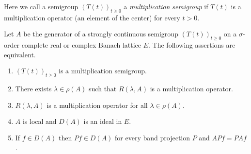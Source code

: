 Here we call a semigroup $(T(t))_{t \geq 0}$ a \emph{multiplication semigroup} if\/ $T(t)$ is a multiplication operator (\ie an element of the center) for every $t > 0$.
\begin{theorem}\label{thm:c2-5.13}
%
Let $A$ be the generator of a strongly continuous semigroup $(T(t))_{t \geq 0}$ on a $\sigma$-order complete real or complex Banach lattice $E$.
The following assertions are equivalent.
\begin{enumerate}[\upshape (a)]
\item \label{thm:c2-5.13-1}
$(T(t))_{t \geq 0}$ is a multiplication semigroup.
\item \label{thm:c2-5.13-2}
There exists $\lambda \in \rho(A)$ such that $R(\lambda,A)$ is a multiplication operator.
\item \label{thm:c2-5.13-3}
$R(\lambda,A)$ is a multiplication operator for all $\lambda \in \rho(A)$.
\item \label{thm:c2-5.13-4}
$A$ is local and $D(A)$ is an ideal in $E$.
\item \label{thm:c2-5.13-5}
If\/ $f \in D(A)$ then $Pf \in D(A)$ for every band projection $P$ and $APf = PAf$.
\end{enumerate}
\end{theorem}
